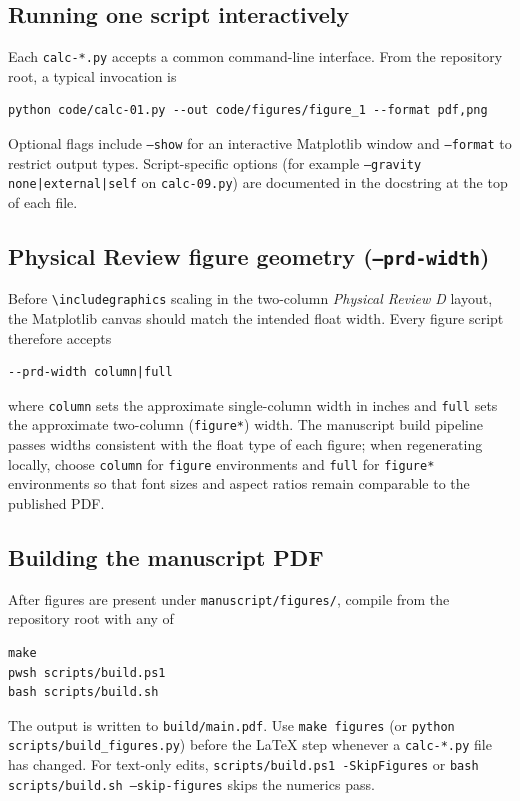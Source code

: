 \subsection{Running one script interactively}

Each \texttt{calc-*.py} accepts a common command-line interface.
From the repository root, a typical invocation is
\begin{verbatim}
python code/calc-01.py --out code/figures/figure_1 --format pdf,png
\end{verbatim}
Optional flags include \texttt{--show} for an interactive Matplotlib window and
\texttt{--format} to restrict output types.
Script-specific options (for example \texttt{--gravity none|external|self} on
\texttt{calc-09.py}) are documented in the docstring at the top of each file.

\subsection{Physical Review figure geometry (\texttt{--prd-width})}

Before \verb|\includegraphics| scaling in the two-column \emph{Physical Review D}
layout, the Matplotlib canvas should match the intended float width.
Every figure script therefore accepts
\begin{verbatim}
--prd-width column|full
\end{verbatim}
where \texttt{column} sets the approximate single-column width in inches and
\texttt{full} sets the approximate two-column (\texttt{figure*}) width.
The manuscript build pipeline passes widths consistent with the float type of
each figure; when regenerating locally, choose \texttt{column} for
\texttt{figure} environments and \texttt{full} for \texttt{figure*} environments
so that font sizes and aspect ratios remain comparable to the published PDF.

\subsection{Building the manuscript PDF}

After figures are present under \texttt{manuscript/figures/}, compile from the
repository root with any of
\begin{verbatim}
make
pwsh scripts/build.ps1
bash scripts/build.sh
\end{verbatim}
The output is written to \texttt{build/main.pdf}.
Use \texttt{make figures} (or \texttt{python scripts/build\_figures.py}) before
the LaTeX step whenever a \texttt{calc-*.py} file has changed.
For text-only edits, \texttt{scripts/build.ps1 -SkipFigures} or
\texttt{bash scripts/build.sh --skip-figures} skips the numerics pass.

